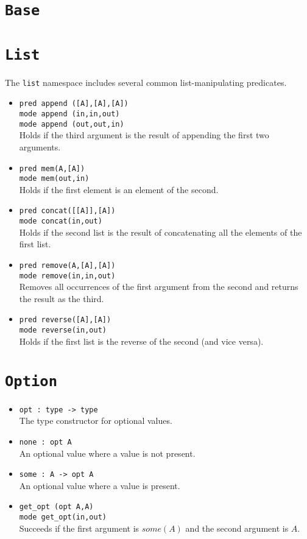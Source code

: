 \documentclass[draft,12pt]{report}
\begin{document}
\section{\tt Base}

\section{\tt List}
The {\tt list} namespace includes several common list-manipulating
predicates.

\begin{itemize}
\item{\tt pred append ([A],[A],[A])}\\
  {\tt mode append (in,in,out)}\\
  {\tt mode append (out,out,in)}\\
  Holds if the third argument is the result of appending the first two
  arguments.
\item{\tt pred mem(A,[A])}\\
  {\tt mode mem(out,in)}\\
  Holds if the first element is an element of the second.
\item{\tt pred concat([[A]],[A])}\\
  {\tt mode concat(in,out)}\\
  Holds if the second list is the result of concatenating all the
  elements of the first list.
\item{\tt pred remove(A,[A],[A])}\\
  {\tt mode remove(in,in,out)}\\
  Removes all occurrences of the first argument from the second and
  returns the result as the third.
  

\item{\tt pred reverse([A],[A])}\\
  {\tt mode reverse(in,out)}\\
  Holds if the first list is the reverse of the second (and vice
  versa).
\end{itemize}


\section{\tt Option}
\begin{itemize}
\item
  {\tt opt : type -> type}\\
  The type constructor for optional values.
\item
  {\tt none : opt A}\\
  An optional value where a value is not present.
\item
  {\tt some : A -> opt A}\\
  An optional value where a value is present.
\item {\tt get\_opt (opt A,A)}\\
  {\tt mode get\_opt(in,out)}\\
  Succeeds if the first argument is $some(A)$ and the second argument
  is $A$.
\end{itemize}
\end{document}
